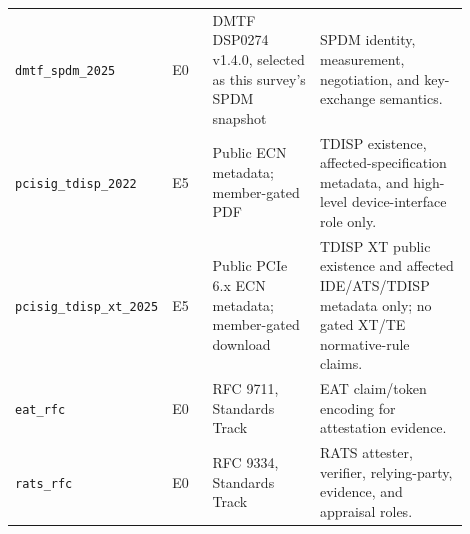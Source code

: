 \documentclass[conference]{IEEEtran}
\begin{document}
\begin{table}[t]
\begin{tabular}{@{}p{0.24\linewidth}p{0.09\linewidth}p{0.24\linewidth}p{0.33\linewidth}@{}}
\texttt{dmtf\_spdm\_2025} & E0 & DMTF DSP0274 v1.4.0, selected as this survey's SPDM snapshot & SPDM identity, measurement, negotiation, and key-exchange semantics. \\
\texttt{pcisig\_tdisp\_2022} & E5 & Public ECN metadata; member-gated PDF & TDISP existence, affected-specification metadata, and high-level device-interface role only. \\
\texttt{pcisig\_tdisp\_xt\_2025} & E5 & Public PCIe 6.x ECN metadata; member-gated download & TDISP XT public existence and affected IDE/ATS/TDISP metadata only; no gated XT/TE normative-rule claims. \\
\texttt{eat\_rfc} & E0 & RFC 9711, Standards Track & EAT claim/token encoding for attestation evidence. \\
\texttt{rats\_rfc} & E0 & RFC 9334, Standards Track & RATS attester, verifier, relying-party, evidence, and appraisal roles. \\ \bottomrule
\end{tabular}
\end{table}
\end{document}
